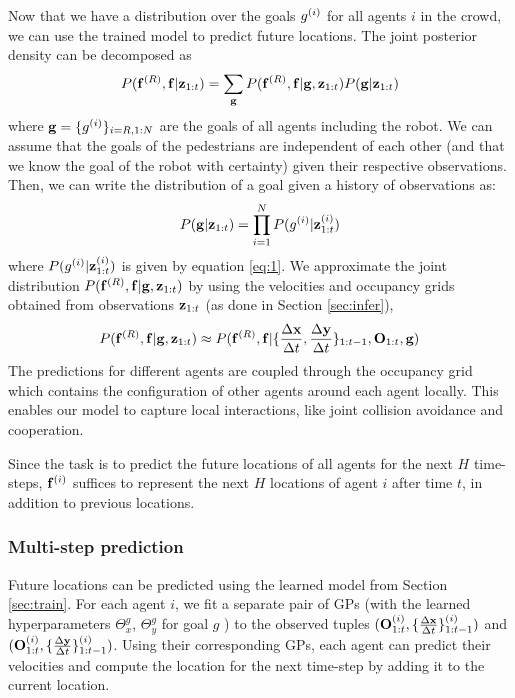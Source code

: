 Now that we have a distribution over the goals $g^{(i)}$ for all agents
$i$ in the crowd, we can use the trained model to predict future
locations. The joint posterior density can be decomposed as
\begin{equation}
  \label{eq:11}
  P(\mathbf{f}^{(R)}, \mathbf{f} | \mathbf{z}_{1:t}) = \sum_{\mathbf{g}} P(\mathbf{f}^{(R)}, \mathbf{f} | \mathbf{g}, \mathbf{z}_{1:t}) P(\mathbf{g} | \mathbf{z}_{1:t})
\end{equation}
where $\mathbf{g} = \{g^{(i)}\}_{i=R,1:N}$ are the goals of all agents
including the robot.
%
%
We can assume that the goals of the pedestrians are independent of
each other (and that we know the goal of the robot with certainty)
given their respective observations. Then, we can write the
distribution of a goal given a history of observations as:
\begin{equation}
  \label{eq:12}
  P(\mathbf{g}|\mathbf{z}_{1:t}) = \prod_{i=1}^{N} P(g^{(i)}|\mathbf{z}_{1:t}^{(i)})
\end{equation}
where $P(g^{(i)}|\mathbf{z}_{1:t}^{(i)})$ is given by equation \ref{eq:1}.
We approximate the joint distribution
$P(\mathbf{f}^{(R)}, \mathbf{f}|\mathbf{g}, \mathbf{z}_{1:t})$ by using the velocities
and occupancy grids obtained from observations $\mathbf{z}_{1:t}$ (as done
in Section \ref{sec:infer}),
\begin{equation}
  \label{eq:13}
  P(\mathbf{f}^{(R)}, \mathbf{f}|\mathbf{g}, \mathbf{z}_{1:t}) \approx P(\mathbf{f}^{(R)}, \mathbf{f}|\{\frac{\Delta \mathbf{x}}{\Delta t}, \frac{\Delta \mathbf{y}}{\Delta t}\}_{1:t-1}, \mathbf{O}_{1:t}, \mathbf{g})
\end{equation}
%
%
The predictions for different agents are coupled through the occupancy
grid which contains the configuration of other agents around each
agent locally.
%
%
%
%
This enables our model to capture local interactions, like joint
collision avoidance and cooperation.

Since the task is to predict the future locations of all agents for
the next $H$ time-steps, $\mathbf{f}^{(i)}$ suffices to represent the next
$H$ locations of agent $i$ after time $t$, in addition to previous
locations.

\subsubsection{Multi-step prediction}
\label{sec:sampling}
Future locations can be predicted using the learned model from Section
\ref{sec:train}. For each agent $i$, we fit a separate pair of GPs
(with the learned hyperparameters $\Theta_x^g$, $\Theta_y^g$ for goal
$g$
%
) to the observed tuples $(\mathbf{O}^{(i)}_{1:t}, \{\frac{\Delta \mathbf{x}}{\Delta t}\}_{1:t-1}^{(i)})$
and $(\mathbf{O}^{(i)}_{1:t}, \{\frac{\Delta \mathbf{y}}{\Delta t}\}_{1:t-1}^{(i)})$. Using their
corresponding GPs, each agent can predict their velocities and compute
the location for the next time-step by adding it to the current
location.

